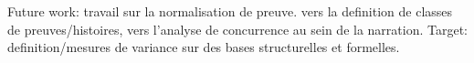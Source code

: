 \documentclass[runningheads,a4paper]{llncs}
\begin{document}
Future work: travail sur la normalisation de preuve. vers la definition de classes de preuves/histoires, vers l'analyse de concurrence au sein de la narration. Target: definition/mesures de variance sur des bases structurelles et formelles.
%


\end{document}
